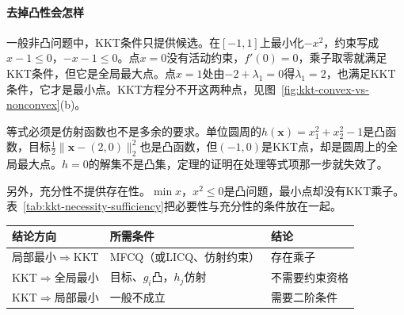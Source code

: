 \paragraph{去掉凸性会怎样}
一般非凸问题中，KKT条件只提供候选。在$[-1,1]$上最小化$-x^2$，约束写成$x-1\leq0$，$-x-1\leq0$。点$x=0$没有活动约束，$f'(0)=0$，乘子取零就满足KKT条件，但它是全局最大点。点$x=1$处由$-2+\lambda_1=0$得$\lambda_1=2$，也满足KKT条件，它才是最小点。KKT方程分不开这两种点，见图~\ref{fig:kkt-convex-vs-nonconvex}(b)。

等式必须是仿射函数也不是多余的要求。单位圆周的$h(\bm{x})=x_1^2+x_2^2-1$是凸函数，目标$\frac12\lVert\bm{x}-(2,0)\rVert_2^2$也是凸函数，但$(-1,0)$是KKT点，却是圆周上的全局最大点。$h=0$的解集不是凸集，定理的证明在处理等式项那一步就失效了。

另外，充分性不提供存在性。$\min x$，$x^2\leq0$是凸问题，最小点却没有KKT乘子。表~\ref{tab:kkt-necessity-sufficiency}把必要性与充分性的条件放在一起。

\begin{BookInlineTable}
  \centering
  \begin{tabular}{@{}lll@{}}
    \toprule
    结论方向 & 所需条件 & 结论\\
    \midrule
    局部最小$\Rightarrow$KKT & MFCQ（或LICQ、仿射约束） & 存在乘子\\
    KKT$\Rightarrow$全局最小 & 目标、$g_i$凸，$h_j$仿射 & 不需要约束资格\\
    KKT$\Rightarrow$局部最小 & 一般不成立 & 需要二阶条件\\
    \bottomrule
  \end{tabular}
  \caption{KKT条件的必要性与充分性。}
  \label{tab:kkt-necessity-sufficiency}
\end{BookInlineTable}
